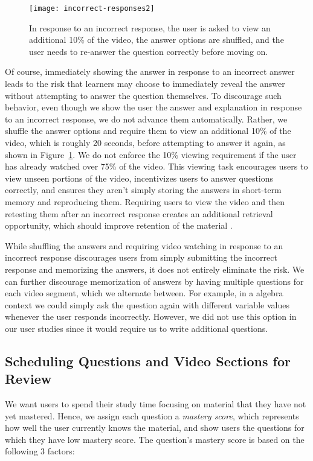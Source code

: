 \documentclass{chi-ext}
\begin{document}
\begin{figure}
\centering
\texttt{[image: incorrect-responses2]}
\caption{In response to an incorrect response, the user is asked to view an additional 10\% of the video, the answer options are shuffled, and the user needs to re-answer the question correctly before moving on.}
\label{fig:figure2}
\end{figure}

Of course, immediately showing the answer in response to an incorrect answer leads to the risk that learners may choose to immediately reveal the answer without attempting to answer the question themselves. To discourage such behavior, even though we show the user the answer and explanation in response to an incorrect response, we do not advance them automatically. Rather, we shuffle the answer options and require them to view an additional 10\% of the video, which is roughly 20 seconds, before attempting to answer it again, as shown in Figure~\ref{fig:figure2}. We do not enforce the 10\% viewing requirement if the user has already watched over 75\% of the video. This viewing task encourages users to view unseen portions of the video, incentivizes users to answer questions correctly, and ensures they aren't simply storing the answers in short-term memory and reproducing them. Requiring users to view the video and then retesting them after an incorrect response creates an additional retrieval opportunity, which should improve retention of the material \cite{testingeffect}.

While shuffling the answers and requiring video watching in response to an incorrect response discourages users from simply submitting the incorrect response and memorizing the answers, it does not entirely eliminate the risk. We can further discourage memorization of answers by having multiple questions for each video segment, which we alternate between. For example, in a algebra context we could simply ask the question again with different variable values whenever the user responds incorrectly. However, we did not use this option in our user studies since it would require us to write additional questions.

\subsection{Scheduling Questions and Video Sections for Review}

We want users to spend their study time focusing on material that they have not yet mastered. Hence, we assign each question a \emph{mastery score}, which represents how well the user currently knows the material, and show users the questions for which they have low mastery score. The question's mastery score is based on the following 3 factors:
\end{document}

